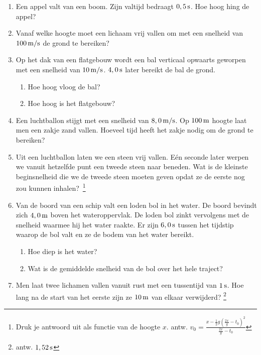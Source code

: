 \begin{enumerate}




\item Een appel valt van een boom. Zijn valtijd bedraagt $0,5\rm\,s$. Hoe hoog hing de appel?



\item Vanaf welke hoogte moet een lichaam vrij vallen om met een snelheid van $100\rm\,m/s$ de grond te bereiken?



\item Op het dak van een flatgebouw wordt een bal verticaal
opwaarts geworpen met een snelheid van $10\rm\,m/s$. $4,0\rm\,s$
later bereikt de bal de grond.
\begin{enumerate}
\item Hoe hoog vloog de bal?
\item Hoe hoog is het flatgebouw?
\end{enumerate}

\item Een luchtballon stijgt met een snelheid van $8,0\rm\,m/s$. Op
$100\rm\,m$ hoogte laat men een zakje zand vallen. Hoeveel tijd
heeft het zakje nodig om de grond te bereiken?

\item Uit een luchtballon laten we een steen vrij vallen. E\'en
seconde later werpen we vanuit hetzelfde punt een tweede steen naar
beneden. Wat is de kleinste beginsnelheid die we de tweede steen
moeten geven opdat ze de eerste nog zou kunnen
inhalen?~\footnote{Druk je antwoord uit als functie van de hoogte
$x$. antw.
$v_0=\frac{x-\frac{1}{2}g(\frac{2x}{g}-t_0)^2}{\frac{2x}{g}-t_0}$}

\item Van de boord van een schip valt een loden bol in het water. De
\mbox{boord} bevindt zich $4,0\rm\,m$ boven het wateroppervlak. De
loden bol zinkt vervolgens met de snelheid waarmee hij het water
raakte. Er zijn $6,0\rm\,s$ tussen het tijdstip waarop de bol valt
en ze de bodem van het water bereikt.
\begin{enumerate}
\item Hoe diep is het water?
\item Wat is de gemiddelde snelheid van de bol over het hele
traject?
\end{enumerate}

\item Men laat twee lichamen vallen vanuit rust met een tussentijd van
$1\rm\,s$. Hoe lang na de start van het eerste zijn ze $10\rm\,m$
van elkaar verwijderd? \footnote{antw. $1,52\rm\,s$}


\end{enumerate}
